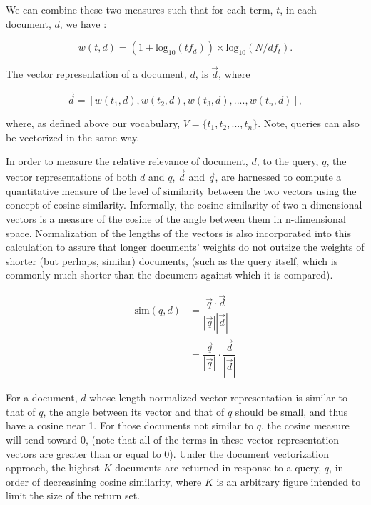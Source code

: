 We can combine these two measures such that for each term, $t$, in each document, $d$, we have \cite{manning_2008_introduction_ch6}:

\begin{equation}
w(t,d) = (1 + \textrm{log}_{10}(tf_d)) \times \textrm{log}_{10}(N/df_t).
\end{equation}

\noindent
The vector representation of a document, $d$, is $\vec{d}$, where

\begin{equation}
\vec{d} =  [w(t_1,d), w(t_2,d), w(t_3,d),...., w(t_n, d)], 
\end{equation}

\noindent
where, as defined above our vocabulary, $V=\{t_1,t_2, ..., t_n\}$.  Note, queries can also be vectorized in the same way.  

In order to measure the relative relevance of document, $d$, to the query, $q$, the vector representations of both $d$ and $q$, $\vec{d}$ and $\vec{q}$, are harnessed to compute a quantitative measure of the level of similarity between the two vectors using the concept of cosine similarity.  Informally, the cosine similarity of two n-dimensional vectors is a measure of the cosine of the angle between them in n-dimensional space.  Normalization of the lengths of the vectors is also incorporated into this calculation to assure that longer documents' weights do not outsize the weights of shorter (but perhaps, similar) documents, (such as the query itself, which is commonly much shorter than the document against which it is compared).  

\begin{equation}
\begin{split}
\textrm{sim}(q, d) & = \dfrac{\vec{q} \cdot \vec{d}}{|\vec{q}||\vec{d}|} \\
 & = \dfrac{\vec{q}}{|\vec{q}|} \cdot \dfrac{\vec{d}}{|\vec{d}|}
\end{split}
\end{equation}

\noindent
For a document, $d$ whose length-normalized-vector representation is similar to that of $q$, the angle between its vector and that of $q$ should be small, and thus have a cosine near 1.  For those documents not similar to $q$, the cosine measure will tend toward 0, (note that all of the terms in these vector-representation vectors are greater than or equal to 0).  Under the document vectorization approach, the highest $K$ documents are returned in response to a query, $q$, in order of decreasining cosine similarity, where $K$ is an arbitrary figure intended to limit the size of the return set.




